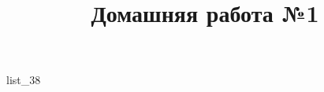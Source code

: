 \documentclass[12pt, a4paper]{article}
\begin{document}
	\title{Домашняя работа №1}
	{list_38}
\end{document}
